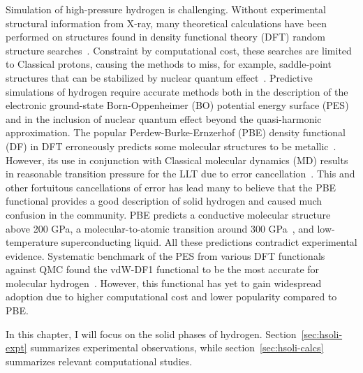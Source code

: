 Simulation of high-pressure hydrogen is challenging. Without experimental structural information from X-ray, many theoretical calculations have been performed on structures found in density functional theory (DFT) random structure searches~\cite{Pickard2007}. Constraint by computational cost, these searches are limited to Classical protons, causing the methods to miss, for example, saddle-point structures that can be stabilized by nuclear quantum effect~\cite{Monserrat2016}.
Predictive simulations of hydrogen require accurate methods both in the description of the electronic ground-state Born-Oppenheimer (BO) potential energy surface (PES) and in the inclusion of nuclear quantum effect beyond the quasi-harmonic approximation.
The popular Perdew-Burke-Ernzerhof (PBE) density functional (DF) in DFT erroneously predicts some molecular structures to be metallic~\cite{Drummond2015}. However, its use in conjunction with Classical molecular dynamics (MD) results in reasonable transition pressure for the LLT due to error cancellation~\cite{Morales2013a}.
This and other fortuitous cancellations of error has lead many to believe that the PBE functional provides a good description of solid hydrogen and caused much confusion in the community. PBE predicts a conductive molecular structure above 200 GPa, a molecular-to-atomic transition around 300 GPa~\cite{McMinis2015}, and low-temperature superconducting liquid. All these predictions contradict experimental evidence. Systematic benchmark of the PES from various DFT functionals against QMC found the vdW-DF1 functional to be the most accurate for molecular hydrogen~\cite{Clay2016}. However, this functional has yet to gain widespread adoption due to higher computational cost and lower popularity compared to PBE.

In this chapter, I will focus on the solid phases of hydrogen. Section~\ref{sec:hsoli-expt} summarizes experimental observations, while section~\ref{sec:hsoli-calcs} summarizes relevant computational studies.

